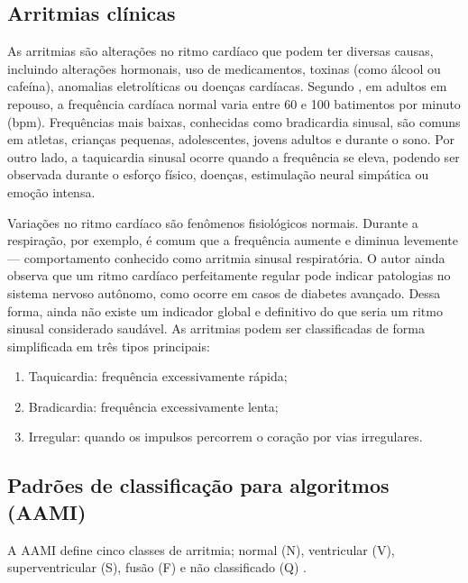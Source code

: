 \subsection{Arritmias clínicas}

As arritmias são alterações no ritmo cardíaco que podem ter diversas causas, incluindo alterações hormonais, uso de medicamentos, toxinas (como álcool ou cafeína), anomalias eletrolíticas ou doenças cardíacas.
Segundo , em adultos em repouso, a frequência cardíaca normal varia entre 60 e 100 batimentos por minuto (bpm). Frequências mais baixas, conhecidas como bradicardia sinusal, são comuns em atletas, crianças pequenas, adolescentes, jovens adultos e durante o sono. Por outro lado, a taquicardia sinusal ocorre quando a frequência se eleva, podendo ser observada durante o esforço físico, doenças, estimulação neural simpática ou emoção intensa.

Variações no ritmo cardíaco são fenômenos fisiológicos normais. Durante a respiração, por exemplo, é comum que a frequência aumente e diminua levemente — comportamento conhecido como arritmia sinusal respiratória. O autor ainda observa que um ritmo cardíaco perfeitamente regular pode indicar patologias no sistema nervoso autônomo, como ocorre em casos de diabetes avançado. Dessa forma, ainda não existe um indicador global e definitivo do que seria um ritmo sinusal considerado saudável.
As arritmias podem ser classificadas de forma simplificada em três tipos principais:

\begin{enumerate}
    \item Taquicardia: frequência excessivamente rápida;
    \item Bradicardia: frequência excessivamente lenta;
    \item Irregular: quando os impulsos percorrem o coração por vias irregulares.
\end{enumerate}

\subsection{Padrões de classificação para algoritmos (AAMI)}

A AAMI define cinco classes de arritmia; normal (N), ventricular (V), superventricular (S), fusão (F) e não classificado (Q) \cite{silva2025,saadatnejad2020}.


